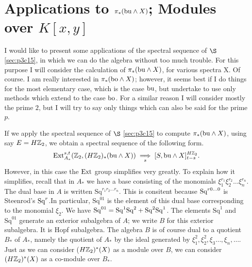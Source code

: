 \documentclass[../main]{subfiles}
\begin{document}


\chapter{Applications to $\pi_{\ast}(\mathrm{bu} \wedge X)$; Modules over $K[x, y]$}
 
\label{sec:p3c16}
 I would like to present some applications of the spectral sequence of $\S$ \ref{sec:p3c15}, in which we can do the algebra without too much trouble. For this purpose I will consider the calculation of $\pi_{\ast}(\mathrm{bu} \wedge X)$, for various spectra X. Of course. I am really interested in $\pi_{\ast}(\mathrm{bo} \wedge X)$; however, it seems best if I do things for the most elementary case, which is the case $\mathrm{bu}$, but undertake to use only methods which extend to the case $\mathrm{bo}$. For a similar reason I will consider mostly the prime $2$, but I will try to say only things which can also be said for the prime $p$.

If we apply the spectral sequence of $\S$ \ref{sec:p3c15} to compute $\pi_{\ast}(\mathrm{bu} \wedge X)$, using say $E=H\mathbb{Z}_2$, we obtain a spectral sequence of the following form. \begin{equation*}
    \mathrm{Ext}_{A_\ast}^{s, t} (\mathbb{Z}_2, (H\mathbb{Z}_2)_{\ast}(\mathrm{bu} \wedge X)) \underset{s}{\implies} [S, \mathrm{bu} \wedge X ]_{t-s}^{H\mathbb{Z}_2}.
\end{equation*}
However, in this case the $\mathrm{Ext}$ group simplifies very greatly. To explain how it simplifies, recall that in $A_{\ast}$ we have a base consisting of the monomials $\xi_{1}^{r_{1}}\xi_{2}^{r_{2}}\dots \xi_{n}^{r_{n}}$. The dual base in $A$ is written 
$\mathrm{Sq}^{r_{1}r_{2}\dots r_{n}}$. This is consitent because $\mathrm{Sq}^{r0\dots 0}$ is Steenrod's $\mathrm{Sq}^r$.In particular, $\mathrm{Sq}^{01}$ is the element of this dual base corresponding to the monomial $\xi_{2}$. We have $\mathrm{Sq}^{01}=\mathrm{Sq}^{1}\mathrm{Sq}^{2}+\mathrm{Sq}^{2}\mathrm{Sq}^{1}$. The elements $\mathrm{Sq}^{1}$ and $\mathrm{Sq}^{01}$ generate an exterior subalgebra of $A$; we write $B$ for this exterior subalgebra. It is Hopf subalgebra. The algebra $B$ is of course dual to a quotient $B_{\ast}$ of $A_{\ast}$, namely the quotient of $A_{\ast}$ by the ideal generated by $\xi_{1}^2, \xi_{2}^2, \xi_{3}\dots, \xi_{n}, \dots $. Just as we can consider ($H\mathbb{Z}_2)^{\ast}(X)$ as a module over $B$, we can consider $(H\mathbb{Z}_2)^{\ast}(X)$ as a 
co-module over $B_{\ast}$.
\end{document}
